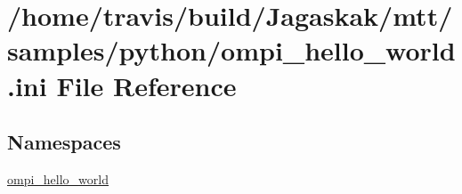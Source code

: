 \hypertarget{ompi__hello__world_8ini}{\section{/home/travis/build/\-Jagaskak/mtt/samples/python/ompi\-\_\-hello\-\_\-world.ini File Reference}
\label{ompi__hello__world_8ini}
}
\subsection*{Namespaces}
\begin{DoxyCompactItemize}
\item 
\hyperlink{namespaceompi__hello__world}{ompi\-\_\-hello\-\_\-world}
\end{DoxyCompactItemize}
